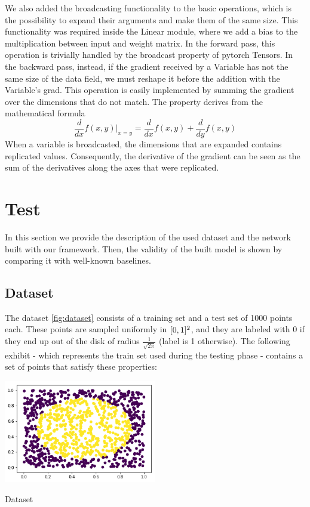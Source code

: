 \documentclass[10pt,conference,compsocconf]{IEEEtran}
\begin{document}
We also added the broadcasting functionality to the basic operations, which is the possibility to expand their arguments and make them of the same size. This functionality was required inside the Linear module, where we add a bias to the multiplication between input and weight matrix.
In the forward pass, this operation is trivially handled by the broadcast property of pytorch Tensors. In the backward pass, instead, if the gradient received by a Variable has not the same size of the data field, we must reshape it before the addition with the Variable's grad. This operation is easily implemented by summing the gradient over the dimensions that do not match. The property derives from the mathematical formula
\[\frac{d}{dx}f(x,y)|_{x=y} = \frac{d}{dx}f(x,y) + \frac{d}{dy}f(x,y)\]
When a variable is broadcasted, the dimensions that are expanded contains replicated values. Consequently, the derivative of the gradient can be seen as the sum of the derivatives along the axes that were replicated.\\

\section{Test}
In this section we provide the description of the used dataset and the network built with our framework. Then, the validity of the built model is shown by comparing it with well-known baselines.

\subsection{Dataset}
The dataset \ref{fig:dataset} consists of a training set and a test set of 1000 points each. These points are sampled uniformly in $[0, 1]\textsuperscript{2}$, and they are labeled with 0 if they end up out of the disk of radius \( \frac{1}{\sqrt{2\pi}} \) (label is 1 otherwise). The following exhibit - which represents the train set used during the testing phase - contains a set of points that satisfy these properties:

\begin{center}
	\captionsetup{type=figure}
	\includegraphics[width=0.5\textwidth]{img/dataset.png}
	\caption{Dataset}
	\label{fig:dataset}
\end{center} 
\end{document}
